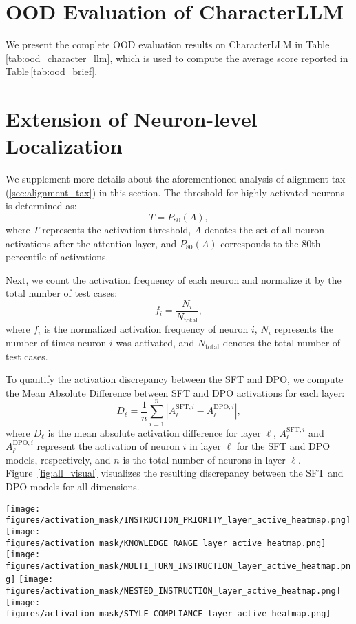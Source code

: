 \section{OOD Evaluation of CharacterLLM}
\label{sec:app_character_llm}
We present the complete OOD evaluation results on CharacterLLM in Table\,\ref{tab:ood_character_llm}, which is used to compute the average score reported in Table\,\ref{tab:ood_brief}.

\section{Extension of Neuron-level Localization} \label{sec:further_interpet}
We supplement more details about the aforementioned analysis of alignment tax (\hyperref[sec:alignment_tax]{\textsection \ref{sec:alignment_tax}}) in this section. The threshold for highly activated neurons is determined as:
\[
T = P_{80}(A),
\]
where \( T \) represents the activation threshold, \( A \) denotes the set of all neuron activations after the attention layer, and \( P_{80}(A) \) corresponds to the 80th percentile of activations.

Next, we count the activation frequency of each neuron and normalize it by the total number of test cases:
\[
f_i = \frac{N_i}{N_{\text{total}}},
\]
where \( f_i \) is the normalized activation frequency of neuron \( i \), \( N_i \) represents the number of times neuron \( i \) was activated, and \( N_{\text{total}} \) denotes the total number of test cases.

To quantify the activation discrepancy between the SFT and DPO, we compute the Mean Absolute Difference between SFT and DPO activations for each layer:
\[
D_{\ell} = \frac{1}{n} \sum_{i=1}^{n} \left| A_{\ell}^{\text{SFT}, i} - A_{\ell}^{\text{DPO}, i} \right|,
\]
where \( D_{\ell} \) is the mean absolute activation difference for layer \( \ell \), \( A_{\ell}^{\text{SFT}, i} \) and \( A_{\ell}^{\text{DPO}, i} \) represent the activation of neuron \( i \) in layer \( \ell \) for the SFT and DPO models, respectively, and \( n \) is the total number of neurons in layer \( \ell \). Figure~\ref{fig:all_visual} visualizes the resulting discrepancy between the SFT and DPO models for all dimensions. 

\begin{figure*}[!ht]
    \centering
    \texttt{[image: figures/activation\_mask/INSTRUCTION\_PRIORITY\_layer\_active\_heatmap.png]}
    \texttt{[image: figures/activation\_mask/KNOWLEDGE\_RANGE\_layer\_active\_heatmap.png]}
    \texttt{[image: figures/activation\_mask/MULTI\_TURN\_INSTRUCTION\_layer\_active\_heatmap.png]}
    \texttt{[image: figures/activation\_mask/NESTED\_INSTRUCTION\_layer\_active\_heatmap.png]}
    \texttt{[image: figures/activation\_mask/STYLE\_COMPLIANCE\_layer\_active\_heatmap.png]}
    \caption{Visualization of Discrepancy Between LLaMA 3.1 8B SFT and DPO's Activation Frequency.}
    \label{fig:all_visual}
\end{figure*}

